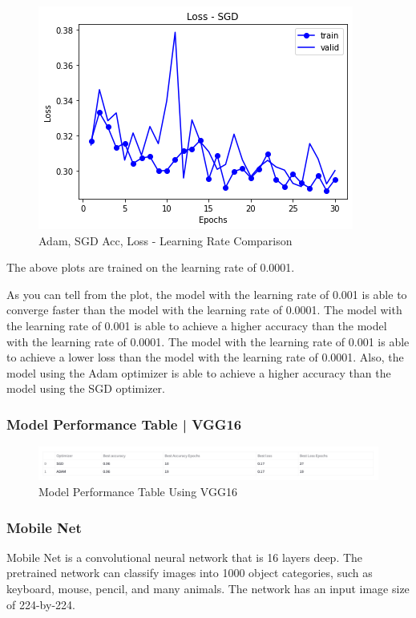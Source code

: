 \begin{figure}[h]
  \includegraphics[scale=0.40]{diagrams/vgg16/0.0001lr_graphs/lr0.0001_SGD_loss.png}
  \caption{Adam, SGD Acc,  Loss - Learning Rate Comparison}
  \end{figure}

The above plots are trained on the learning rate of 0.0001.

As you can tell from the plot, the model with the learning rate of 0.001 is able to converge faster than the model with the learning rate of 0.0001. The model with the learning rate of 0.001 is able to achieve a higher accuracy than the model with the learning rate of 0.0001. The model with the learning rate of 0.001 is able to achieve a lower loss than the model with the learning rate of 0.0001. Also, the model using the Adam optimizer is able to achieve a higher accuracy than the model using the SGD optimizer.

\subsubsection{Model Performance Table | VGG16}
\begin{figure}[h]
  \centering
  \includegraphics[scale=0.40]{vgg16-table.png}
  \caption{Model Performance Table Using VGG16}
  \end{figure}

\subsubsection*{Mobile Net}
Mobile Net is a convolutional neural network that is 16 layers deep. The pretrained network can classify images into 1000 object categories, such as keyboard, mouse, pencil, and many animals. The network has an input image size of 224-by-224.

